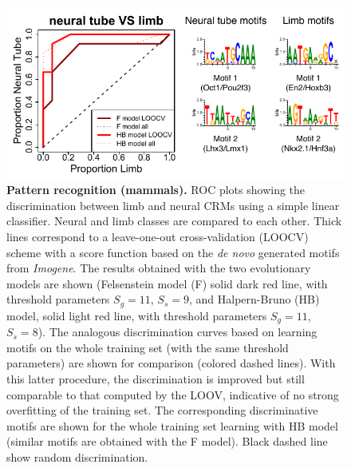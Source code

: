 \documentclass[a4,center,fleqn]{NAR}
\begin{document}
\clearpage
    \begin{figure}[!htbp]
\begin{center}    
\includegraphics[width=15cm]{figuresnar-sub/fig4.pdf}
\end{center}
\caption{\normalsize
    {\bf Pattern recognition (mammals).} 
     ROC plots showing the discrimination between limb and neural CRMs using
     a simple linear classifier.
     Neural and limb classes are compared to each other. 
     Thick lines correspond to a leave-one-out cross-validation (LOOCV) scheme
     with a score function based on the {\it de novo} generated motifs from
     {\em Imogene}. 
     The results obtained with the two evolutionary models are shown
     (Felsenstein model (F) solid dark red line, with threshold parameters
     $S_g=11$, $S_s=9$, and Halpern-Bruno (HB) model, solid light red line,
     with threshold parameters $S_g=11$, $S_s=8$).
     The analogous discrimination curves based on learning motifs on  the whole
     training set (with the same threshold parameters) are shown for comparison
     (colored dashed lines). With this latter procedure, the discrimination is
     improved but still comparable to that computed by the LOOV, indicative of
     no strong overfitting of the training set. The corresponding
     discriminative motifs are shown for the whole training set learning with
     HB model (similar motifs are obtained with the F model).
     Black dashed line show random discrimination.  }   
    \label{fig:patternmam}
\end{figure}
\end{document}

